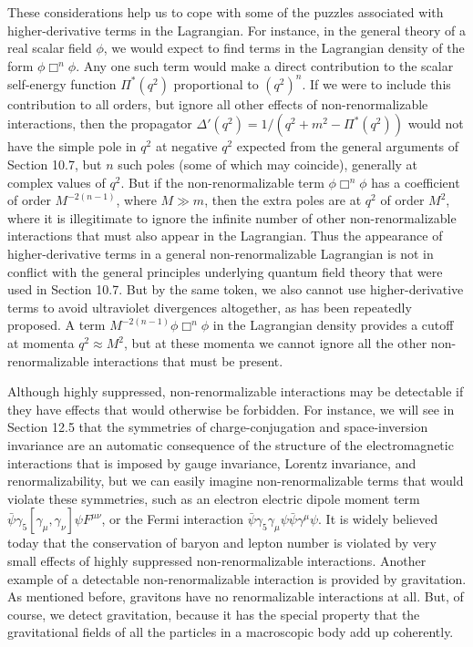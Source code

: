 These considerations help us to cope with some of the puzzles associated with
higher-derivative terms in the Lagrangian. For instance, in the general theory
of a real scalar field $\phi$, we would expect to find terms in the Lagrangian
density of the form $\phi\Box^n\phi$. Any one such term would make a direct
contribution to the scalar self-energy function $\Pi^*(q^2)$ proportional to
$(q^2)^n$. If we were to include this contribution to all orders, but ignore
all other effects of non-renormalizable interactions, then the propagator
$\Delta'(q^2)=1/(q^2+m^2-\Pi^*(q^2))$ would not have the simple pole in $q^2$
at negative $q^2$ expected from the general arguments of Section 10.7, but
$n$ such poles (some of which may coincide), generally at complex values of
$q^2$. But if the non-renormalizable term $\phi\Box^n\phi$ has a coefficient
of order $M^{-2(n-1)}$, where $M\gg m$, then the extra poles are at $q^2$ of
order $M^2$, where it is illegitimate to ignore the infinite number of other
non-renormalizable interactions that must also appear in the Lagrangian. Thus
the appearance of higher-derivative terms in a general non-renormalizable
Lagrangian is not in conflict with the general principles underlying quantum
field theory that were used in Section 10.7. But by the same token, we also
cannot use higher-derivative terms to avoid ultraviolet divergences
altogether, as has been repeatedly proposed. A term
$M^{-2(n-1)}\phi\Box^n\phi$ in the Lagrangian density provides a cutoff at
momenta $q^2\approx M^2$, but at these momenta we cannot ignore all the other
non-renormalizable interactions that must be present.

Although highly suppressed, non-renormalizable interactions may be detectable
if they have effects that would otherwise be forbidden. For instance, we will
see in Section 12.5 that the symmetries of charge-conjugation and
space-inversion invariance are an automatic consequence of the structure of
the electromagnetic interactions that is imposed by gauge invariance, Lorentz
invariance, and renormalizability, but we can easily imagine
non-renormalizable terms that would violate these symmetries, such as an
electron electric dipole moment term
$\bar\psi\gamma_5[\gamma_\mu,\gamma_\nu]\psi F^{\mu\nu}$, or the Fermi
interaction $\bar\psi\gamma_5\gamma_\mu\psi\bar\psi\gamma^\mu\psi$. It is
widely believed today that the conservation of baryon and lepton number is
violated by very small effects of highly suppressed non-renormalizable
interactions. Another example of a detectable non-renormalizable interaction
is provided by gravitation. As mentioned before, gravitons have no
renormalizable interactions at all. But, of course, we detect gravitation,
because it has the special property that the gravitational fields of all the
particles in a macroscopic body add up coherently.

